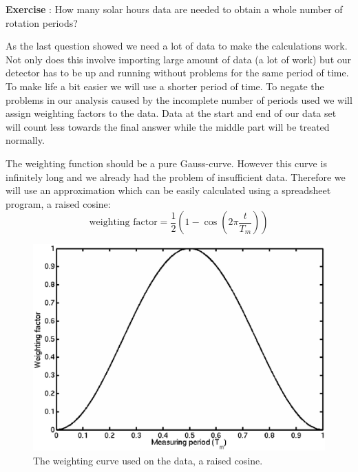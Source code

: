 \documentclass[12pt,a4paper]{article}
\numberwithin{equation}{section}
\numberwithin{figure}{section}
\newcounter{Exercise}
\numberwithin{table}{section}
\begin{document}
\begin{shaded}
\textbf{Exercise \theExercise {}} : How many solar hours data are needed to obtain a whole number of rotation periods?\end{shaded}

As the last question showed we need a lot of data to make the calculations work. Not only does this involve importing large amount of data (a lot of work) but our detector has to be up and running without problems for the same period of time. To make life a bit easier we will use a shorter period of time. To negate the problems in our analysis caused by the incomplete number of periods used we will assign weighting factors to the data. Data at the start and end of our data set will count less towards the final answer while the middle part will be treated normally. 

The weighting function should be a pure Gauss-curve. However this curve is infinitely long and we already had the problem of insufficient data. Therefore we will use an approximation which can be easily calculated using a spreadsheet program, a raised cosine:
\begin{equation} \mbox{weighting factor} = \frac{1}{2} \left( 1 - \cos\left( 2 \pi \frac{t}{T_m}\right) \right) \end{equation}

\begin{figure}\begin{center}
\includegraphics[scale=0.5]{raised_cosine.eps}
\caption{The weighting curve used on the data, a raised cosine.}\label{fig:raised_cosine}
\end{center}\end{figure} 
\end{document}
